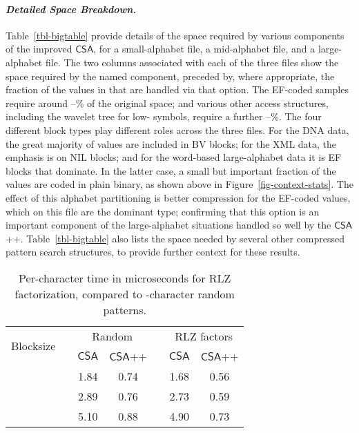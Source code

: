 \documentclass{llncs}
\newcommand{\myparagraph}[1]{\paragraph*{\normalsize\it#1.}}
\newcommand{\CSA}[0]{\ensuremath{\mathsf{CSA}}}
\begin{document}
\myparagraph{Detailed Space Breakdown}

Table~\ref{tbl-bigtable} provide details of the space required by
various components of the improved {\CSA}, for a small-alphabet file,
a mid-alphabet file, and a large-alphabet file.
The two columns associated with each of the three files show the
space required by the named component, preceded by, where
appropriate, the fraction of the values in  that are handled
via that option.
The EF-coded samples require around --\% of the original space;
and various other access structures, including the wavelet tree for
low- symbols, require a further --\%.
The four different block types play different roles across the three
files.
For the DNA data, the great majority of  values are included in
BV blocks; for the XML data, the emphasis is on NIL blocks; and for
the word-based large-alphabet data it is EF blocks that dominate.
In the latter case, a small but important fraction of the 
values are coded in plain binary, as shown above in
Figure~\ref{fig-context-stats}.
The effect of this alphabet partitioning is better compression for
the EF-coded values, which on this file are the dominant type;
confirming that this option is an important component of the
large-alphabet situations handled so well by the {\CSA++}.
Table~\ref{tbl-bigtable} also lists the space needed by several other
compressed pattern search structures, to provide further context for
these results.

\begin{wraptable}{r}{55mm}
\vspace*{-8mm}
\begin{tabular}{c c cc c cc}
\toprule
\multirow{2}{*}{Blocksize}
	&& \multicolumn{2}{c}{{Random}}
		&& \multicolumn{2}{c}{{RLZ factors}}
\\
\cmidrule{3-4}\cmidrule{6-7}
	&& \CSA & \CSA++
		&& \CSA & \CSA++
\\
\midrule

	&& 1.84 & 0.74
		&& 1.68 & 0.56
\\

	&& 2.89 & 0.76
		&& 2.73 & 0.59
\\

	&& 5.10 & 0.88
		&& 4.90 & 0.73
\\
\bottomrule
\end{tabular}

 \vspace*{-2mm}
\caption{Per-character time in microseconds for RLZ factorization,
compared to -character random patterns.
\vspace*{-6mm}
\label{tbl-rlzspeeds}}
\end{wraptable}
\end{document}
